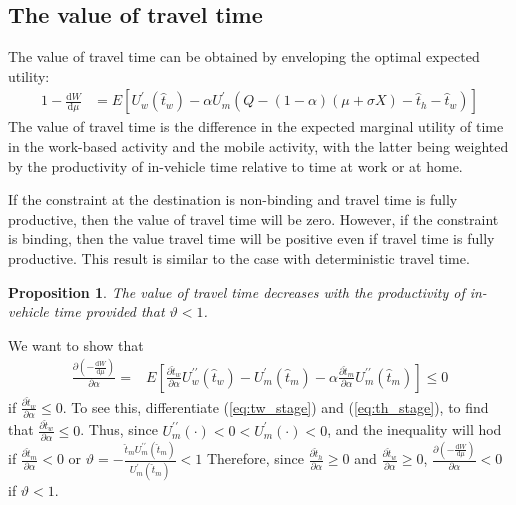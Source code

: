 \documentclass[12pt,a4paper,british]{article}
\makeatletter
\newenvironment{proof}[1][\proofname]{\par
    \normalfont\topsep6\p@\@plus6\p@\relax
    \trivlist
    \itemindent\parindent
    \item[\hskip\labelsep
          \scshape
      #1]\ignorespaces
  }{%
    \endtrivlist\@endpefalse
  }
\providecommand{\proofname}{Proof}
\newtheorem{prop}{Proposition}[section]
\makeatother
\begin{document}


\subsection*{The value of travel time}

The value of travel time can be obtained by enveloping the optimal expected utility:
\begin{alignat*}{1}
-\frac{\mathrm{d}W}{\mathrm{d}\mu} & =E\left[U_{w}^{\prime}\left(\hat{t}_{w}\right)-\alpha U_{m}^{\prime}\left(Q-\left(1-\alpha\right)\left(\mu+\sigma X\right)-\hat{t}_{h}-\hat{t}_{w}\right)\right]
\end{alignat*}
The value of travel time is the difference in the expected marginal utility of time in the work-based activity and the mobile activity, with the latter being weighted by the productivity of in-vehicle time relative to time at work or at home. 

If the constraint at the destination is non-binding and travel time is fully productive, then the value of travel time will be zero. However, if the constraint is binding, then the value travel time will be positive even if travel time is fully productive. This result is similar to the case with deterministic travel time.

\begin{prop}
The value of travel time decreases with the productivity of in-vehicle time provided that $\vartheta<1$.
\end{prop}

\begin{proof}
We want to show that 
\begin{align*}
\frac{\partial\left(-\frac{\mathrm{d}W}{\mathrm{d}\mu}\right)}{\partial\alpha}= & E\left[\frac{\partial\hat{t}_{w}}{\partial\alpha}U_{w}^{\prime\prime}\left(\hat{t}_{w}\right) -U_{m}^{\prime}\left(\hat{t}_{m}\right) -\alpha \frac{\partial\hat{t}_{m}}{\partial\alpha} U_{m}^{\prime\prime}\left(\hat{t}_{m}\right)\right] \leq 0
\end{align*}
if $\frac{\partial\hat{t}_{w}}{\partial\alpha}\leq 0$. To see this, differentiate (\ref{eq:tw_stage})
and (\ref{eq:th_stage}), to find that $\frac{\partial\hat{t}_{w}}{\partial\alpha}\leq 0$.  Thus, since $U_{m}^{\prime\prime}\left( \cdot\right)<0<U_{m}^{\prime}\left( \cdot\right)<0$,  and the inequality will hod if $\frac{\partial\hat{t}_{m}}{\partial\alpha}<0$ or $\vartheta=-\frac{\hat{t}_{m}U_{m}^{\prime\prime}\left(\hat{t}_{m}\right)}{U_{m}^{\prime}\left(\hat{t}_{m}\right)}<1$
Therefore, since $\frac{\partial\hat{t}_{h}}{\partial\alpha}\geq0$ and $\frac{\partial\hat{t}_{w}}{\partial\alpha}\geq0$, $\frac{\partial\left(-\frac{\mathrm{d}W}{\mathrm{d}\mu}\right)}{\partial\alpha}<0$ if $\vartheta<1$.
\end{proof}
\end{document}

